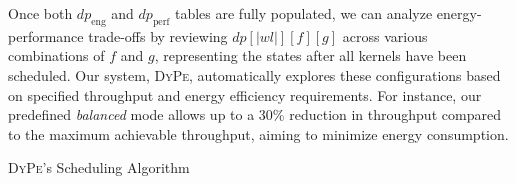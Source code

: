 Once both $dp_{\text{eng}}$ and $dp_{\text{perf}}$ tables are fully populated, we can analyze energy-performance trade-offs by reviewing $dp[|wl|][f][g]$ across various combinations of $f$ and $g$, representing the states after all kernels have been scheduled. Our system, \textsc{DyPe}, automatically explores these configurations based on specified throughput and energy efficiency requirements. For instance, our predefined \textit{balanced} mode allows up to a 30\% reduction in throughput compared to the maximum achievable throughput, aiming to minimize energy consumption.


\setlength{\textfloatsep}{1pt}%
\begin{algorithm}
\caption{\textsc{DyPe}'s Scheduling Algorithm}\label{alg:scheduling}
\begin{algorithmic}[1]


\end{algorithmic}
\end{algorithm}
